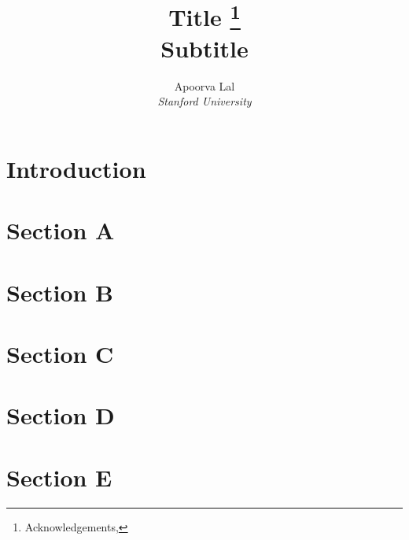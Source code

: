 \documentclass[a4paper, 12pt]{article}
\title{Title \thanks{Acknowledgements, \updateinfo } \\
  \large Subtitle}
\author{
  Apoorva Lal \\
  \emph{Stanford University}
}
\begin{document}
\begin{titlingpage}
    \maketitle
    \begin{abstract}
        \lipsum[4]
    \end{abstract}
\end{titlingpage}


\section*{Introduction}


\cite{Deatonanalysishouseholdsurveys1997}

\parencite{Acemoglucolonialoriginscomparative2001}


\section{Section A}
\lipsum[2]

\section{Section B}
\lipsum[3]

\section{Section C}
\lipsum[3]

\section{Section D}
\lipsum[4]

\section{Section E}
\lipsum[7]

\renewcommand{\mkbibnamefamily}[1]{\textsc{#1}} %
\printbibliography
\end{document}
